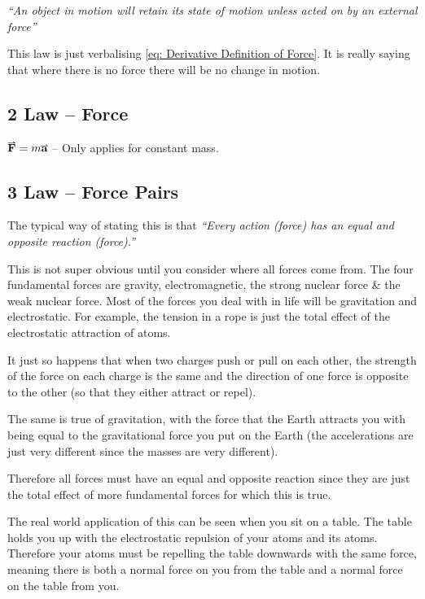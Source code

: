 \documentclass[main.tex]{subfiles}
\begin{document}
                    \textit{``An object in motion will retain its state of motion unless acted on by an external force''}

                    This law is just verbalising \eqref{eq: Derivative Definition of Force}. It is really saying that where there is no force there will be no change in motion. 

                
                \subsection{2 Law -- Force}
                    \label{subsec: Newton Second Law}

                    $\vect{F} = m \vect{a}$ -- Only applies for constant mass.

                
                \subsection{3 Law -- Force Pairs}
                    \label{subsec: Newton Third Law}

                    The typical way of stating this is that \textit{``Every action (force) has an equal and opposite reaction (force).''}

                    This is not super obvious until you consider where all forces come from. The four fundamental forces are gravity, electromagnetic, the strong nuclear force \& the weak nuclear force. Most of the forces you deal with in life will be gravitation and electrostatic. For example, the tension in a rope is just the total effect of the electrostatic attraction of atoms.
                    
                    It just so happens that when two charges push or pull on each other, the strength of the force on each charge is the same and the direction of one force is opposite to the other (so that they either attract or repel).

                    The same is true of gravitation, with the force that the Earth attracts you with being equal to the gravitational force you put on the Earth (the accelerations are just very different since the masses are very different).

                    Therefore all forces must have an equal and opposite reaction since they are just the total effect of more fundamental forces for which this is true.

                    The real world application of this can be seen when you sit on a table. The table holds you up with the electrostatic repulsion of your atoms and its atoms. Therefore your atoms must be repelling the table downwards with the same force, meaning there is both a normal force on you from the table and a normal force on the table from you.
\end{document}
